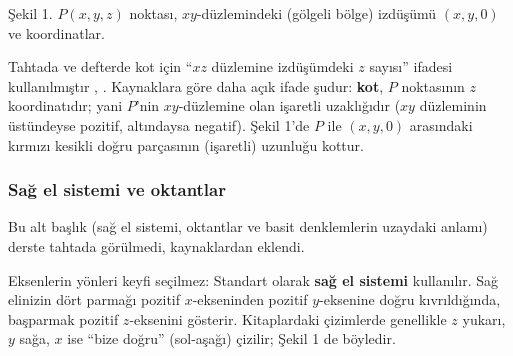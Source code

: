 \begin{center}

{\small Şekil 1. $P(x,y,z)$ noktası, $xy$-düzlemindeki (gölgeli bölge) izdüşümü $(x,y,0)$ ve koordinatlar.}
\end{center}

\begin{bilgi}
Tahtada ve defterde kot için ``$xz$ düzlemine izdüşümdeki $z$ sayısı'' ifadesi kullanılmıştır , . Kaynaklara göre daha açık ifade şudur: \textbf{kot}, $P$ noktasının $z$ koordinatıdır; yani $P$'nin $xy$-düzlemine olan işaretli uzaklığıdır ($xy$ düzleminin üstündeyse pozitif, altındaysa negatif). Şekil 1'de $P$ ile $(x,y,0)$ arasındaki kırmızı kesikli doğru parçasının (işaretli) uzunluğu kottur.
\end{bilgi}

\subsubsection{Sağ el sistemi ve oktantlar}

\begin{bilgi}
Bu alt başlık (sağ el sistemi, oktantlar ve basit denklemlerin uzaydaki anlamı) derste tahtada görülmedi, kaynaklardan eklendi.
\end{bilgi}

Eksenlerin yönleri keyfi seçilmez: Standart olarak \textbf{sağ el sistemi} kullanılır. Sağ elinizin dört parmağı pozitif $x$-ekseninden pozitif $y$-eksenine doğru kıvrıldığında, başparmak pozitif $z$-eksenini gösterir. Kitaplardaki çizimlerde genellikle $z$ yukarı, $y$ sağa, $x$ ise ``bize doğru'' (sol-aşağı) çizilir; Şekil 1 de böyledir.

